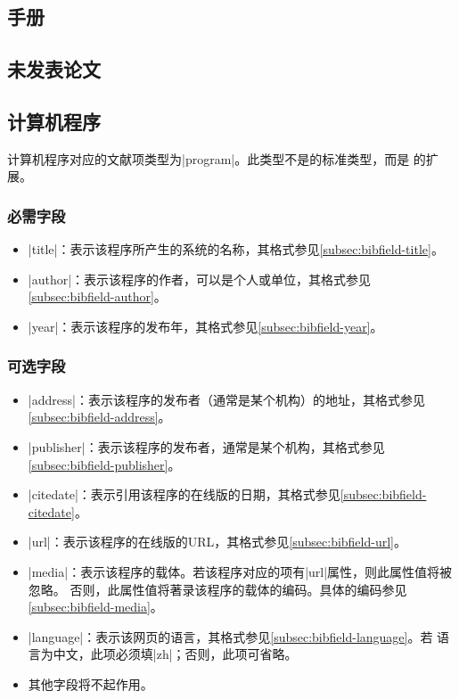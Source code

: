 \subsection{手册}\label{subsec:bibtype-manual}

\subsection{未发表论文}\label{subsec:bibtype-unpublished}


\subsection{计算机程序}\label{subsec:bibtype-program}

计算机程序对应的{\BibTeX}文献项类型为|program|。此类型不是{\BibTeX}的标准类型，而是
{\njuthesis}的扩展。

\subsubsection{必需字段}

\begin{itemize}
\item |title|：表示该程序所产生的系统的名称，其格式参见\ref{subsec:bibfield-title}。
\item |author|：表示该程序的作者，可以是个人或单位，其格式参见
  \ref{subsec:bibfield-author}。
\item |year|：表示该程序的发布年，其格式参见\ref{subsec:bibfield-year}。
\end{itemize}

\subsubsection{可选字段}

\begin{itemize}
\item |address|：表示该程序的发布者（通常是某个机构）的地址，其格式参见
  \ref{subsec:bibfield-address}。
\item |publisher|：表示该程序的发布者，通常是某个机构，其格式参见
  \ref{subsec:bibfield-publisher}。
\item |citedate|：表示引用该程序的在线版的日期，其格式参见\ref{subsec:bibfield-citedate}。
\item |url|：表示该程序的在线版的URL，其格式参见\ref{subsec:bibfield-url}。
\item |media|：表示该程序的载体。若该程序对应的{\BibTeX}项有|url|属性，则此属性值将被忽略。
否则，此属性值将著录该程序的载体的编码。具体的编码参见\ref{subsec:bibfield-media}。
\item |language|：表示该网页的语言，其格式参见\ref{subsec:bibfield-language}。若
  语言为中文，此项必须填|zh|；否则，此项可省略。
\item 其他字段将不起作用。
\end{itemize}

